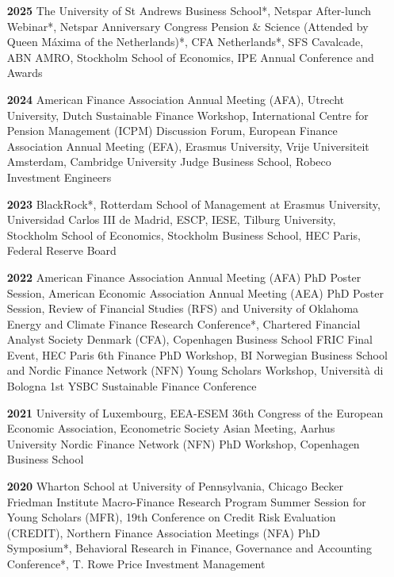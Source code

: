 \documentclass[11pt]{res} %
\begin{document}
\begin{resume}
\begin{itemize}
\item[\textbf{2025}] The University of St Andrews Business School*, Netspar After-lunch Webinar*, Netspar Anniversary Congress Pension \& Science (Attended by Queen Máxima of the Netherlands)*, CFA Netherlands*, SFS Cavalcade, ABN AMRO, Stockholm School of Economics, IPE Annual Conference and Awards\\[-1ex] 

\item[\textbf{2024}] American Finance Association Annual Meeting (AFA), Utrecht University, Dutch Sustainable Finance Workshop, International Centre for Pension Management (ICPM)  Discussion Forum, European Finance Association Annual Meeting (EFA), Erasmus University, Vrije Universiteit Amsterdam, Cambridge University Judge Business School, Robeco Investment Engineers\\[-1ex] %

\item[\textbf{2023}] BlackRock*, Rotterdam School of Management at Erasmus University, Universidad Carlos III de Madrid, ESCP, IESE, Tilburg University, Stockholm School of Economics, Stockholm Business School, HEC Paris, Federal Reserve Board\\[-1ex]

\item[\textbf{2022}]  American Finance Association Annual Meeting (AFA) PhD Poster Session, American Economic Association Annual Meeting (AEA) PhD Poster Session, Review of Financial Studies (RFS) and University of Oklahoma Energy and Climate Finance Research Conference*, Chartered Financial Analyst Society Denmark (CFA), Copenhagen Business School FRIC Final Event, HEC Paris 6th Finance PhD Workshop,  BI Norwegian Business School and Nordic Finance Network (NFN) Young Scholars Workshop, Università di Bologna 1st YSBC Sustainable Finance Conference\\[-1ex]

\item[\textbf{2021}]  University of Luxembourg, EEA-ESEM 36th Congress of the European Economic Association, Econometric Society Asian Meeting,  Aarhus University Nordic Finance Network (NFN) PhD Workshop, Copenhagen Business School\\[-1ex]

\item[\textbf{2020}]  Wharton School at University of Pennsylvania, Chicago Becker Friedman Institute Macro-Finance Research Program Summer Session for Young Scholars (MFR), 19th Conference on Credit Risk Evaluation (CREDIT), Northern Finance Association Meetings (NFA) PhD Symposium*, Behavioral Research in Finance, Governance and Accounting Conference*, T. Rowe Price Investment Management\\[-1ex]


\end{itemize}
\end{resume}
\end{document}
